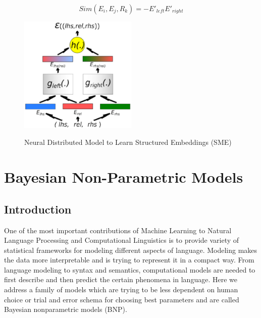    \begin{equation}
    \label{eq:dot} Sim(E_{i}, E_{j}, R_{k}) = -E'_{left}E'_{right}
   \end{equation}
     \begin{figure}[h!]
  \caption{Neural Distributed Model to Learn Structured Embeddings (SME)}
  \centering
    \includegraphics[width=0.5\textwidth]{bordes2012.eps}
    \label{fig:bordes2012}
\end{figure} 
   

\iffalse
\section{Bayesian Non-Parametric Models}
\label {sec:bnp}

\subsection{Introduction}
\label{ssec:intro}
One of the most important contributions of Machine Learning to Natural Language
Processing and Computational Linguistics is to provide variety of statistical frameworks for modeling
 different aspects of language. Modeling makes the data more interpretable and is trying to represent 
 it in a compact way. From language modeling to syntax and semantics, 
 computational models are needed to first describe and then predict the certain phenomena in language. 
 Here we address a family of models which are trying to be less dependent on human choice or 
 trial and error schema for choosing best parameters and are called Bayesian nonparametric models (BNP).
 
